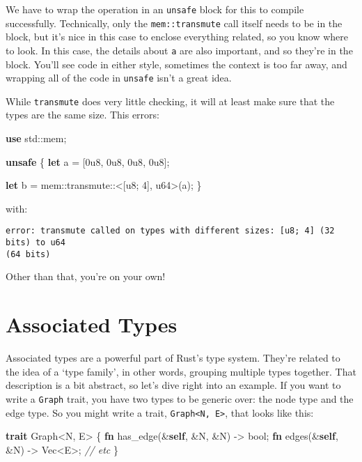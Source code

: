 \documentclass[a4paper,]{book}
\newenvironment{Shaded}{\begin{snugshade}}{\end{snugshade}}
\newcommand{\KeywordTok}[1]{\textcolor[rgb]{0.13,0.29,0.53}{\textbf{{#1}}}}
\newcommand{\DataTypeTok}[1]{\textcolor[rgb]{0.13,0.29,0.53}{{#1}}}
\newcommand{\DecValTok}[1]{\textcolor[rgb]{0.00,0.00,0.81}{{#1}}}
\newcommand{\CommentTok}[1]{\textcolor[rgb]{0.56,0.35,0.01}{\textit{{#1}}}}
\newcommand{\NormalTok}[1]{{#1}}
\begin{document}
We have to wrap the operation in an \texttt{unsafe} block for this to
compile successfully. Technically, only the \texttt{mem::transmute} call
itself needs to be in the block, but it's nice in this case to enclose
everything related, so you know where to look. In this case, the details
about \texttt{a} are also important, and so they're in the block. You'll
see code in either style, sometimes the context is too far away, and
wrapping all of the code in \texttt{unsafe} isn't a great idea.

While \texttt{transmute} does very little checking, it will at least
make sure that the types are the same size. This errors:

\begin{Shaded}
\begin{Highlighting}[]
\KeywordTok{use} \NormalTok{std::mem;}

\KeywordTok{unsafe} \NormalTok{\{}
    \KeywordTok{let} \NormalTok{a = [}\DecValTok{0u8}\NormalTok{, }\DecValTok{0u8}\NormalTok{, }\DecValTok{0u8}\NormalTok{, }\DecValTok{0u8}\NormalTok{];}

    \KeywordTok{let} \NormalTok{b = mem::transmute::<[}\DataTypeTok{u8}\NormalTok{; }\DecValTok{4}\NormalTok{], }\DataTypeTok{u64}\NormalTok{>(a);}
\NormalTok{\}}
\end{Highlighting}
\end{Shaded}

with:

\begin{verbatim}
error: transmute called on types with different sizes: [u8; 4] (32 bits) to u64
(64 bits)
\end{verbatim}

Other than that, you're on your own!

\section{Associated Types}\label{sec--associated-types}

Associated types are a powerful part of Rust's type system. They're
related to the idea of a `type family', in other words, grouping
multiple types together. That description is a bit abstract, so let's
dive right into an example. If you want to write a \texttt{Graph} trait,
you have two types to be generic over: the node type and the edge type.
So you might write a trait,
\texttt{Graph\textless{}N,\ E\textgreater{}}, that looks like this:

\begin{Shaded}
\begin{Highlighting}[]
\KeywordTok{trait} \NormalTok{Graph<N, E> \{}
    \KeywordTok{fn} \NormalTok{has_edge(&}\KeywordTok{self}\NormalTok{, &N, &N) -> }\DataTypeTok{bool}\NormalTok{;}
    \KeywordTok{fn} \NormalTok{edges(&}\KeywordTok{self}\NormalTok{, &N) -> }\DataTypeTok{Vec}\NormalTok{<E>;}
    \CommentTok{// etc}
\NormalTok{\}}
\end{Highlighting}
\end{Shaded}
\end{document}
